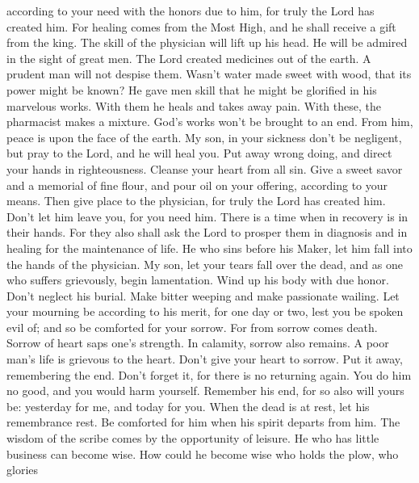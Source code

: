 according to your need with the honors due to him, for truly the Lord
has created him.  For healing comes from the Most High, and
he shall receive a gift from the king.  The skill of the
physician will lift up his head. He will be admired in the sight of
great men.  The Lord created medicines out of the earth. A
prudent man will not despise them.  Wasn't water made sweet
with wood, that its power might be known?  He gave men skill
that he might be glorified in his marvelous works.  With
them he heals and takes away pain.  With these, the
pharmacist makes a mixture. God's works won't be brought to an end. From
him, peace is upon the face of the earth.  My son, in your
sickness don't be negligent, but pray to the Lord, and he will heal you.
 Put away wrong doing, and direct your hands in
righteousness. Cleanse your heart from all sin.  Give a
sweet savor and a memorial of fine flour, and pour oil on your offering,
according to your means.  Then give place to the physician,
for truly the Lord has created him. Don't let him leave you, for you
need him.  There is a time when in recovery is in their
hands.  For they also shall ask the Lord to prosper them in
diagnosis and in healing for the maintenance of life.  He
who sins before his Maker, let him fall into the hands of the physician.
 My son, let your tears fall over the dead, and as one who
suffers grievously, begin lamentation. Wind up his body with due honor.
Don't neglect his burial.  Make bitter weeping and make
passionate wailing. Let your mourning be according to his merit, for one
day or two, lest you be spoken evil of; and so be comforted for your
sorrow.  For from sorrow comes death. Sorrow of heart saps
one's strength.  In calamity, sorrow also remains. A poor
man's life is grievous to the heart.  Don't give your heart
to sorrow. Put it away, remembering the end.  Don't forget
it, for there is no returning again. You do him no good, and you would
harm yourself.  Remember his end, for so also will yours
be: yesterday for me, and today for you.  When the dead is
at rest, let his remembrance rest. Be comforted for him when his spirit
departs from him.  The wisdom of the scribe comes by the
opportunity of leisure. He who has little business can become wise.
 How could he become wise who holds the plow, who glories
